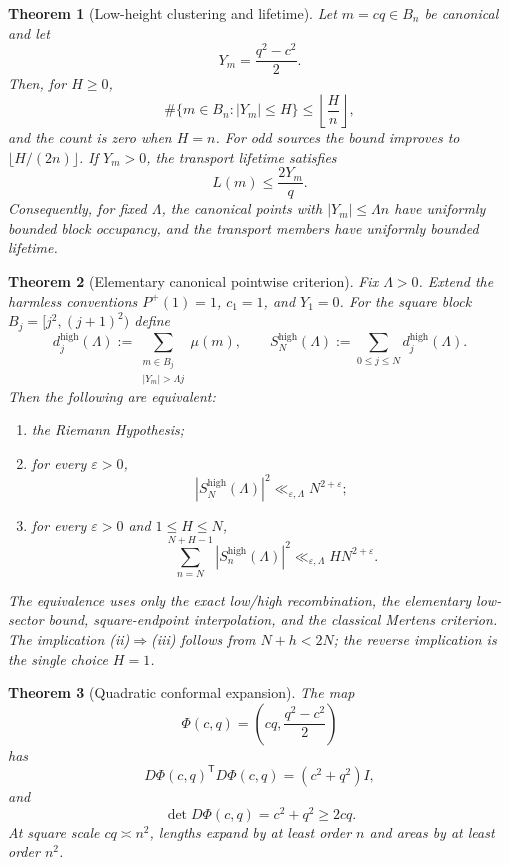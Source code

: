 \documentclass[11pt]{article}
\newtheorem{theorem}{Theorem}[section]
\theoremstyle{definition}
\newcommand{\eps}{\varepsilon}
\newcommand{\Pplus}{P^{+}}
\newcommand{\1}{\mathbf{1}}
\begin{document}
\begin{theorem}[Low-height clustering and lifetime]
\label{thm:intro-low}
Let $m=cq\in B_n$ be canonical and let
\[
 Y_m=\frac{q^2-c^2}{2}.
\]
Then, for $H\ge0$,
\[
 \#\{m\in B_n:|Y_m|\le H\}
 \le\left\lfloor\frac{H}{n}\right\rfloor,
\]
and the count is zero when $H=n$.  For odd sources the bound improves to
$\lfloor H/(2n)\rfloor$.
If $Y_m>0$, the transport lifetime satisfies
\[
 L(m)\le\frac{2Y_m}{q}.
\]
Consequently, for fixed $\Lambda$, the canonical points with $|Y_m|\le\Lambda n$ have uniformly bounded block occupancy, and the transport members have uniformly bounded lifetime.
\end{theorem}

\begin{theorem}[Elementary canonical pointwise criterion]
\label{thm:intro-canonical-HS}
Fix $\Lambda>0$.  Extend the harmless conventions $\Pplus(1)=1$, $c_1=1$, and $Y_1=0$.  For the square block $B_j=[j^2,(j+1)^2)$ define
\[
 d_j^{\mathrm{high}}(\Lambda)
 :=
 \sum_{\substack{m\in B_j\\|Y_m|>\Lambda j}}\mu(m),
 \qquad
 S_N^{\mathrm{high}}(\Lambda)
 :=\sum_{0\le j\le N}d_j^{\mathrm{high}}(\Lambda).
\]
Then the following are equivalent:
\begin{enumerate}[label=\textup{(\roman*)},leftmargin=2.2em,itemsep=0.25em]
\item the Riemann Hypothesis;
\item for every $\eps>0$,
\begin{equation}
 \boxed{
 |S_N^{\mathrm{high}}(\Lambda)|^2
 \ll_{\eps,\Lambda}N^{2+\eps};
 }
 \tag{PHS}
 \label{eq:intro-canonical-PHS}
\end{equation}
\item for every $\eps>0$ and $1\le H\le N$,
\begin{equation}
 \sum_{n=N}^{N+H-1}|S_n^{\mathrm{high}}(\Lambda)|^2
 \ll_{\eps,\Lambda}HN^{2+\eps}.
 \tag{HS}
 \label{eq:intro-canonical-HS}
\end{equation}
\end{enumerate}
The equivalence uses only the exact low/high recombination, the elementary low-sector bound, square-endpoint interpolation, and the classical Mertens criterion.  The implication \textup{(ii)}$\Rightarrow$\textup{(iii)} follows from $N+h<2N$; the reverse implication is the single choice $H=1$.
\end{theorem}

\begin{theorem}[Quadratic conformal expansion]
\label{thm:intro-jacobian}
The map
\[
 \Phi(c,q)=\left(cq,\frac{q^2-c^2}{2}\right)
\]
has
\[
 D\Phi(c,q)^{\mathsf T}D\Phi(c,q)
 =(c^2+q^2)I,
\]
and
\[
 \det D\Phi(c,q)=c^2+q^2\ge2cq.
\]
At square scale $cq\asymp n^2$, lengths expand by at least order $n$ and areas by at least order $n^2$.
\end{theorem}
\end{document}
